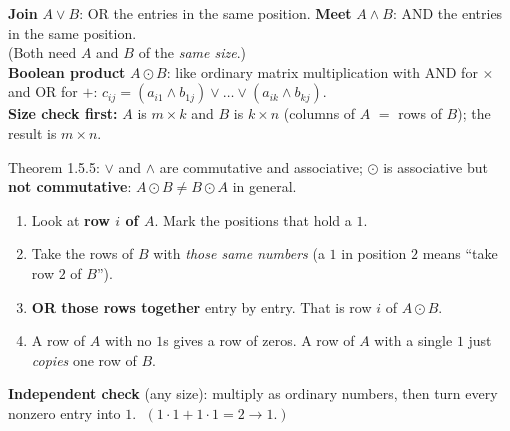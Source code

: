 \documentclass{fkt-notes}
\theoremstyle{definition}
\begin{document}
\begin{rulebox}[title={The three operations}]
  \textbf{Join} $A\vee B$: OR the entries in the same position.\quad
  \textbf{Meet} $A\wedge B$: AND the entries in the same position.\\
  (Both need $A$ and $B$ of the \emph{same size}.)\\[3pt]
  \textbf{Boolean product} $A\odot B$: like ordinary matrix multiplication
  with AND for $\times$ and OR for $+$:
  $c_{ij}=(a_{i1}\wedge b_{1j})\vee\dots\vee(a_{ik}\wedge b_{kj})$.\\
  \textbf{Size check first:} $A$ is $m\times k$ and $B$ is $k\times n$ (columns of $A$ $=$ rows of $B$);
  the result is $m\times n$.
\end{rulebox}
\begin{rulepar}
  Theorem 1.5.5: $\vee$ and $\wedge$ are commutative and associative;
  $\odot$ is associative but \textbf{not commutative}: $A\odot B\neq B\odot A$ in general.
\end{rulepar}

\begin{rulebox}[title={How to compute $A\odot B$ by hand: the row rule}]
  \begin{enumerate}[nosep,label=\arabic*.]
    \item Look at \textbf{row $i$ of $A$}. Mark the positions that hold a $1$.
    \item Take the rows of $B$ with \emph{those same numbers} (a $1$ in
          position $2$ means ``take row $2$ of $B$'').
    \item \textbf{OR those rows together} entry by entry. That is row $i$
          of $A\odot B$.
    \item A row of $A$ with no $1$s gives a row of zeros. A row of $A$ with
          a single $1$ just \emph{copies} one row of $B$.
  \end{enumerate}
  \textbf{Independent check} (any size): multiply as ordinary numbers, then
  turn every nonzero entry into $1$. $\;(1\cdot1+1\cdot1=2\to1.)$
\end{rulebox}
\end{document}
